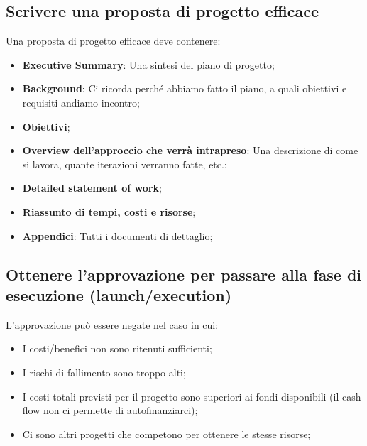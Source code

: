 \subsection{Scrivere una proposta di progetto efficace}
Una proposta di progetto efficace deve contenere:
\begin{itemize}
	\item \textbf{Executive Summary}: Una sintesi del piano di progetto;
	\item \textbf{Background}: Ci ricorda perché abbiamo fatto il piano, a quali obiettivi e requisiti andiamo incontro;
	\item \textbf{Obiettivi};
	\item \textbf{Overview dell'approccio che verrà intrapreso}: Una descrizione di come si lavora, quante iterazioni verranno fatte, etc.;
	\item \textbf{Detailed statement of work};
	\item \textbf{Riassunto di tempi, costi e risorse};
	\item \textbf{Appendici}: Tutti i documenti di dettaglio;
\end{itemize}
\subsection{Ottenere l’approvazione per passare alla fase di esecuzione (launch/execution)}
L'approvazione può essere negate nel caso in cui:
\begin{itemize}
	\item I costi/benefici non sono ritenuti sufficienti;
	\item I rischi di fallimento sono troppo alti;
	\item I costi totali previsti per il progetto sono superiori ai fondi disponibili (il cash flow non ci permette di autofinanziarci);
	\item Ci sono altri progetti che competono per ottenere le stesse risorse;
\end{itemize}

\newpage
